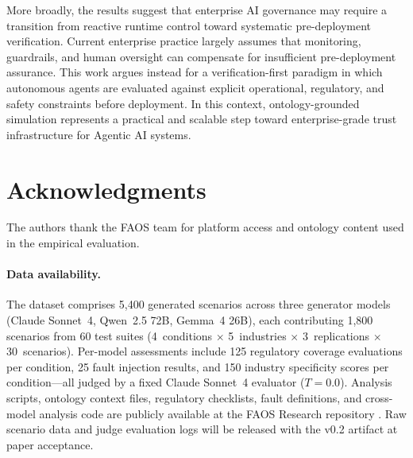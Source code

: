 \documentclass[11pt,a4paper]{article}
\begin{document}
More broadly, the results suggest that enterprise AI governance may
require a transition from reactive runtime control toward systematic
pre-deployment verification. Current enterprise practice largely
assumes that monitoring, guardrails, and human oversight can
compensate for insufficient pre-deployment assurance. This work argues
instead for a verification-first paradigm in which autonomous agents
are evaluated against explicit operational, regulatory, and safety
constraints before deployment. In this context, ontology-grounded
simulation represents a practical and scalable step toward
enterprise-grade trust infrastructure for Agentic AI systems.

\section*{Acknowledgments}

The authors thank the FAOS team for platform access and ontology
content used in the empirical evaluation.

\paragraph{Data availability.}
The dataset comprises 5,400 generated scenarios across three
generator models (Claude Sonnet~4, Qwen~2.5 72B, Gemma~4 26B),
each contributing 1,800 scenarios from 60 test suites
(4~conditions $\times$ 5~industries $\times$ 3~replications $\times$
30~scenarios). Per-model assessments include 125 regulatory coverage
evaluations per condition, 25 fault injection results, and 150
industry specificity scores per condition---all judged by a fixed
Claude Sonnet~4 evaluator ($T{=}0.0$). Analysis scripts, ontology
context files, regulatory checklists, fault definitions, and
cross-model analysis code are publicly available at the FAOS Research
repository \citep{faos-research-repo}. Raw scenario data and judge
evaluation logs will be released with the v0.2 artifact at paper acceptance.


\end{document}
